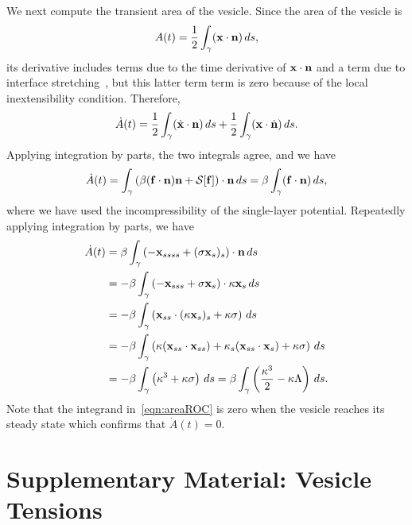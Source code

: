 \documentclass[9pt,twocolumn,twoside,lineno]{pnas-new}
\begin{document}
We next compute the transient area of the vesicle. Since the area of the
vesicle is
\begin{align}
  A(t) = \frac{1}{2}\int_{\gamma} (\mathbf{x} \cdot \mathbf{n})\, ds,
  \label{eqn:area}
\end{align}
its derivative includes terms due to the time derivative of $\mathbf{x} \cdot
\mathbf{n}$ and a term due to interface stretching~\cite{lai-tse-hua2008}, but
this latter term term is zero because of the local inextensibility
condition. Therefore,
\begin{align}
  \dot{A}(t) =
  \frac{1}{2} \int_{\gamma} (\dot{\mathbf{x}} \cdot \mathbf{n})\, ds  + 
  \frac{1}{2} \int_{\gamma} (\mathbf{x} \cdot \dot{\mathbf{n}})\, ds.
\end{align}
Applying integration by parts, the two integrals agree, and we have
\begin{align}
  \dot{A}(t) = \int_\gamma \left(\beta (\mathbf{f} \cdot \mathbf{n})\mathbf{n} 
    + \mathcal{S}[\mathbf{f}]\right) \cdot \mathbf{n}\, ds 
  = \beta \int_\gamma (\mathbf{f} \cdot \mathbf{n})\, ds,
\end{align}
where we have used the incompressibility of the single-layer potential.
Repeatedly applying integration by parts, we have
\begin{align}
  \dot{A}(t) &= \beta \int_\gamma \left( -\mathbf{x}_{ssss} + 
    (\sigma \mathbf{x}_s)_s \right) \cdot \mathbf{n} \, ds \\
  &= -\beta \int_\gamma \left(-\mathbf{x}_{sss} + \sigma \mathbf{x}_s 
    \right) \cdot \kappa \mathbf{x}_s \, ds \\
  &= -\beta \int_\gamma \left(\mathbf{x}_{ss} \cdot 
    (\kappa \mathbf{x}_s)_s + \kappa \sigma \right) \, ds \\
  &= -\beta \int_\gamma \left(\kappa (\mathbf{x}_{ss} \cdot \mathbf{x}_{ss}) + 
    \kappa_s (\mathbf{x}_{ss} \cdot \mathbf{x}_s) + \kappa \sigma \right) 
    \, ds \\
  &  = -\beta \int_\gamma \left(\kappa^3 + \kappa \sigma \right) 
    \, ds = \beta \int_\gamma \left(
    \frac{\kappa^3}{2} - \kappa \Lambda \right) \, ds.
  \label{eqn:areaROC}
\end{align}
Note that the integrand in~\eqref{eqn:areaROC} is zero when the vesicle
reaches its steady state which confirms that $\dot{A}(t) = 0$.

\section*{Supplementary Material: Vesicle Tensions}
\end{document}
